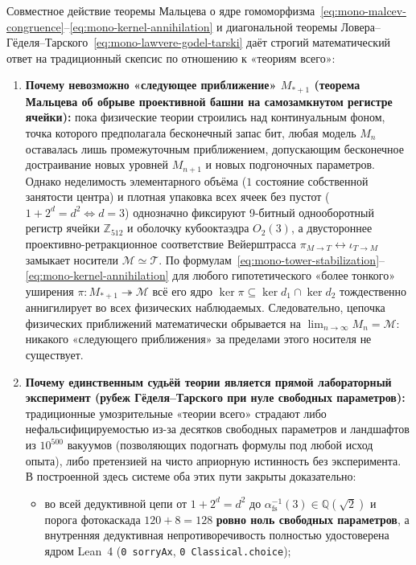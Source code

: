 Совместное действие теоремы Мальцева о ядре гомоморфизма~\eqref{eq:mono-malcev-congruence}--\eqref{eq:mono-kernel-annihilation} и диагональной теоремы Ловера--Гёделя--Тарского~\eqref{eq:mono-lawvere-godel-tarski} даёт строгий математический ответ на традиционный скепсис по отношению к «теориям всего»:
\begin{enumerate}[label=\textbf{\arabic*.},leftmargin=*]
\item \textbf{Почему невозможно «следующее приближение» $M_{*+1}$ (теорема Мальцева об обрыве проективной башни на самозамкнутом регистре ячейки):}
  пока физические теории строились над континуальным фоном, точка которого предполагала бесконечный запас бит, любая модель $M_n$ оставалась лишь промежуточным приближением, допускающим бесконечное достраивание новых уровней $M_{n+1}$ и новых подгоночных параметров. Однако неделимость элементарного объёма ($1$ состояние собственной занятости центра) и плотная упаковка всех ячеек без пустот ($1 + 2^d = d^2 \iff d = 3$) однозначно фиксируют 9-битный однооборотный регистр ячейки $\mathbb{Z}_{512}$ и оболочку кубооктаэдра $O_2(3)$, а двустороннее проективно-ретракционное соответствие Вейерштрасса $\pi_{M\to T} \leftrightarrow \iota_{T\to M}$ замыкает носители $\mathcal{M} \simeq \mathcal{T}$. По формулам~\eqref{eq:mono-tower-stabilization}--\eqref{eq:mono-kernel-annihilation} для любого гипотетического «более тонкого» уширения $\pi : M_{*+1} \twoheadrightarrow \mathcal{M}$ всё его ядро $\ker\pi \subseteq \ker d_1 \cap \ker d_2$ тождественно аннигилирует во всех физических наблюдаемых. Следовательно, цепочка физических приближений математически обрывается на $\lim_{n\to\infty} M_n = \mathcal{M}$: никакого «следующего приближения» за пределами этого носителя не существует.
\item \textbf{Почему единственным судьёй теории является прямой лабораторный эксперимент (рубеж Гёделя--Тарского при нуле свободных параметров):}
  традиционные умозрительные «теории всего» страдают либо нефальсифицируемостью из-за десятков свободных параметров и ландшафтов из $10^{500}$ вакуумов (позволяющих подогнать формулы под любой исход опыта), либо претензией на чисто априорную истинность без эксперимента. В построенной здесь системе оба этих пути закрыты доказательно:
  \begin{itemize}[noitemsep]
  \item во всей дедуктивной цепи от $1 + 2^d = d^2$ до $\alpha_{\mathrm{fs}}^{-1}(3) \in \mathbb{Q}(\sqrt{2})$ и порога фотокаскада $120 + 8 = 128$ \textbf{ровно ноль свободных параметров}, а внутренняя дедуктивная непротиворечивость полностью удостоверена ядром Lean~4 (\texttt{0 sorryAx}, \texttt{0 Classical.choice});

\end{itemize}
\end{enumerate}
